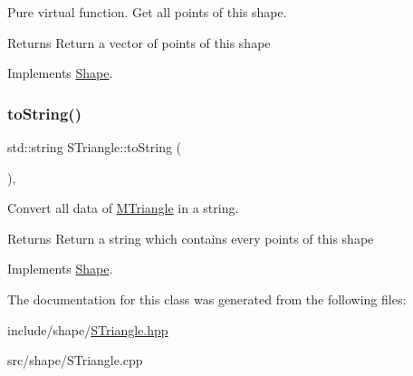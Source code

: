 Pure virtual function. Get all points of this shape. 

\begin{DoxyReturn}{Returns}
Return a vector of points of this shape 
\end{DoxyReturn}


Implements \hyperlink{classShape_a6eb0d80cccc44cb72b06c61d9780bc6b}{Shape}.

\mbox{\label{classSTriangle_a32e4cee65f52d9ee4121c78dc97d86ab}} 
\subsubsection{\texorpdfstring{to\+String()}{toString()}}
{\footnotesize\ttfamily std\+::string S\+Triangle\+::to\+String (\begin{DoxyParamCaption}{ }\end{DoxyParamCaption})\hspace{0.3cm}{\ttfamily [override]}, {\ttfamily [virtual]}}



Convert all data of \hyperlink{classMTriangle}{M\+Triangle} in a string. 

\begin{DoxyReturn}{Returns}
Return a string which contains every points of this shape 
\end{DoxyReturn}


Implements \hyperlink{classShape_a98fa87c6dc4c7045fd6897a8f3bc186c}{Shape}.



The documentation for this class was generated from the following files\+:\begin{DoxyCompactItemize}
\item 
include/shape/\hyperlink{STriangle_8hpp}{S\+Triangle.\+hpp}\item 
src/shape/S\+Triangle.\+cpp\end{DoxyCompactItemize}
